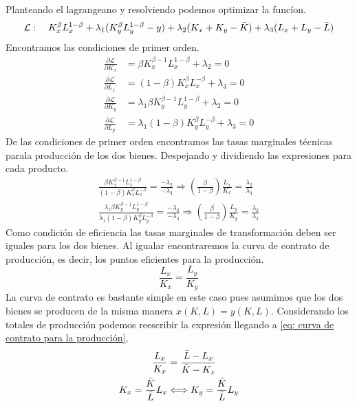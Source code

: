 Planteando el lagrangeano y resolviendo podemos optimizar la funcíon.
\begin{equation*}
    \mathcal{L}: \quad K_x^\beta L_x^{1-\beta} + \lambda_1(K_y^\beta L_y^{1-\beta} - y) + \lambda_2(K_x + K_y - \Bar{K}) + \lambda_3(L_x + L_y - \Bar{L}) 
\end{equation*}
Encontramos las condiciones de primer orden.
\begin{align}
    \frac{\partial \mathcal{L}}{\partial K_x} &= \beta K_x^{\beta-1}L_x^{1-\beta} + \lambda_2 = 0 \\ 
    \frac{\partial \mathcal{L}}{\partial L_x} &= (1-\beta)K_x^\beta L_x^{-\beta} + \lambda_3 = 0 \\
    \frac{\partial \mathcal{L}}{\partial K_y} &= \lambda_1\beta K_y^{\beta-1}L_y^{1- \beta} + \lambda_2 = 0 \\
    \frac{\partial \mathcal{L}}{\partial L_y} &= \lambda_1 (1-\beta) K_y^\beta L_y^{-\beta} + \lambda_3 = 0
\end{align}
De las condiciones de primer orden encontramos las tasas marginales técnicas parala producción de los dos bienes. Despejando y dividiendo las expresiones para cada producto.
\begin{align}
    \frac{\beta K_x^{\beta-1}L_x^{1-\beta}}{(1-\beta)K_x^\beta L_x^{-\beta}} = \frac{-\lambda_2}{-\lambda_3} \Longrightarrow \left( \frac{\beta}{1-\beta} \right)\frac{L_x}{K_x} = \frac{\lambda_2}{\lambda_3} \\
    \frac{\lambda_1\beta K_y^{\beta-1}L_y^{1- \beta}}{\lambda_1 (1-\beta) K_y^\beta L_y^{-\beta}} = \frac{-\lambda_2}{-\lambda_3} \Longrightarrow \left( \frac{\beta}{1-\beta} \right) \frac{L_y}{K_y} = \frac{\lambda_2}{\lambda_3}
\end{align}
Como condición de eficiencia las tasas marginales de transformación deben ser iguales para los dos bienes. Al igualar encontraremos la curva de contrato de producción, es decir, los puntos eficientes para la producción. 
\begin{equation}
    \frac{L_x}{K_x} = \frac{L_y}{K_y}
\end{equation}
La curva de contrato es bastante simple en este caso pues asumimos que los dos bienes se producen de la misma manera $x(K,L) = y(K,L)$. Considerando los totales de producción podemos reescribir la expresión llegando a \ref{eq: curva de contrato para la producción},
\begin{align}
    \frac{L_x}{K_x} &= \frac{\bar{L}-L_x}{\bar{K}-K_x} \notag \\
    K_x = \frac{\bar{K}}{\bar{L}}L_x &\Longleftrightarrow K_y = \frac{\bar{K}}{\bar{L}}L_y   \label{eq: curva de contrato para la producción}
\end{align}


